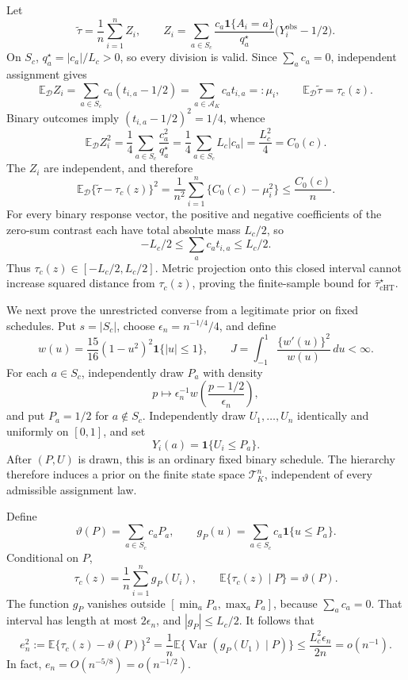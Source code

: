 Let
\[
 \widetilde\tau=\frac1n\sum_{i=1}^n Z_i,
 \qquad
 Z_i=\sum_{a\in S_c}\frac{c_a\mathbf 1\{A_i=a\}}{q_a^\star}
 \bigl(Y_i^{\mathrm{obs}}-1/2\bigr).
\]
On \(S_c\), \(q_a^\star=|c_a|/L_c>0\), so every division is valid.  Since \(\sum_a c_a=0\), independent assignment gives
\[
 \mathbb E_{\mathcal D}Z_i
 =\sum_{a\in S_c}c_a(t_{i,a}-1/2)
 =\sum_{a\in\mathcal A_K}c_at_{i,a}=:\mu_i,
 \qquad
 \mathbb E_{\mathcal D}\widetilde\tau=\tau_c(z).
\]
Binary outcomes imply \((t_{i,a}-1/2)^2=1/4\), whence
\[
 \mathbb E_{\mathcal D}Z_i^2
 =\frac14\sum_{a\in S_c}\frac{c_a^2}{q_a^\star}
 =\frac14\sum_{a\in S_c}L_c|c_a|
 =\frac{L_c^2}{4}=C_0(c).
\]
The \(Z_i\) are independent, and therefore
\[
 \mathbb E_{\mathcal D}\{\widetilde\tau-\tau_c(z)\}^2
 =\frac1{n^2}\sum_{i=1}^n\{C_0(c)-\mu_i^2\}
 \le\frac{C_0(c)}n.
\]
For every binary response vector, the positive and negative coefficients of the zero-sum contrast each have total absolute mass \(L_c/2\), so
\[
 -L_c/2\le\sum_a c_at_{i,a}\le L_c/2.
\]
Thus \(\tau_c(z)\in[-L_c/2,L_c/2]\).  Metric projection onto this closed interval cannot increase squared distance from \(\tau_c(z)\), proving the finite-sample bound for \(\widehat\tau_{\mathrm{cHT}}^\star\).

We next prove the unrestricted converse from a legitimate prior on fixed schedules.  Put \(s=|S_c|\), choose \(\epsilon_n=n^{-1/4}/4\), and define
\[
 w(u)=\frac{15}{16}(1-u^2)^2\mathbf 1\{|u|\le1\},
 \qquad
 J=\int_{-1}^1\frac{\{w'(u)\}^2}{w(u)}\,du<\infty.
\]
For each \(a\in S_c\), independently draw \(P_a\) with density
\[
 p\longmapsto\epsilon_n^{-1}w\!\left(\frac{p-1/2}{\epsilon_n}\right),
\]
and put \(P_a=1/2\) for \(a\notin S_c\).  Independently draw \(U_1,\ldots,U_n\) identically and uniformly on \([0,1]\), and set
\[
 Y_i(a)=\mathbf 1\{U_i\le P_a\}.
\]
After \((P,U)\) is drawn, this is an ordinary fixed binary schedule.  The hierarchy therefore induces a prior on the finite state space \(\mathcal T_K^n\), independent of every admissible assignment law.

Define
\[
 \vartheta(P)=\sum_{a\in S_c}c_aP_a,
 \qquad
 g_P(u)=\sum_{a\in S_c}c_a\mathbf 1\{u\le P_a\}.
\]
Conditional on \(P\),
\[
 \tau_c(z)=\frac1n\sum_{i=1}^ng_P(U_i),
 \qquad
 \mathbb E\{\tau_c(z)\mid P\}=\vartheta(P).
\]
The function \(g_P\) vanishes outside \([\min_aP_a,\max_aP_a]\), because \(\sum_a c_a=0\).  That interval has length at most \(2\epsilon_n\), and \(|g_P|\le L_c/2\).  It follows that
\[
 e_n^2:=\mathbb E\{\tau_c(z)-\vartheta(P)\}^2
 =\frac1n\mathbb E\{\operatorname{Var}(g_P(U_1)\mid P)\}
 \le\frac{L_c^2\epsilon_n}{2n}=o(n^{-1}).
\]
In fact, \(e_n=O(n^{-5/8})=o(n^{-1/2})\).

